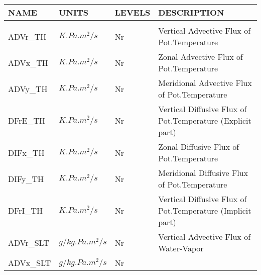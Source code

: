 \newpage
\vspace*{\fill}
\begin{table}
\begin{tabular}{llll}
\hline\hline
 NAME & UNITS & LEVELS & DESCRIPTION \\
\hline

&\\
 ADVr\_TH  & $K.Pa.m^2/s   $ & Nr 
         &\begin{minipage}[t]{3in}
          {Vertical   Advective Flux of Pot.Temperature}
         \end{minipage}\\
 ADVx\_TH  & $K.Pa.m^2/s   $ & Nr 
         &\begin{minipage}[t]{3in}
          {Zonal      Advective Flux of Pot.Temperature}
         \end{minipage}\\
 ADVy\_TH  & $K.Pa.m^2/s   $ & Nr 
         &\begin{minipage}[t]{3in}
          {Meridional Advective Flux of Pot.Temperature}
         \end{minipage}\\
 DFrE\_TH  & $K.Pa.m^2/s   $ & Nr 
         &\begin{minipage}[t]{3in}
          {Vertical Diffusive Flux of Pot.Temperature (Explicit part)}
         \end{minipage}\\
 DIFx\_TH  & $K.Pa.m^2/s   $ & Nr 
         &\begin{minipage}[t]{3in}
          {Zonal      Diffusive Flux of Pot.Temperature}
         \end{minipage}\\
 DIFy\_TH  & $K.Pa.m^2/s   $ & Nr 
         &\begin{minipage}[t]{3in}
          {Meridional Diffusive Flux of Pot.Temperature}
         \end{minipage}\\
 DFrI\_TH  & $K.Pa.m^2/s   $ & Nr 
         &\begin{minipage}[t]{3in}
          {Vertical Diffusive Flux of Pot.Temperature (Implicit part)}
         \end{minipage}\\
 ADVr\_SLT & $g/kg.Pa.m^2/s$ & Nr 
         &\begin{minipage}[t]{3in}
          {Vertical   Advective Flux of Water-Vapor}
         \end{minipage}\\
 ADVx\_SLT & $g/kg.Pa.m^2/s$ & Nr 

\end{tabular}
\end{table}
